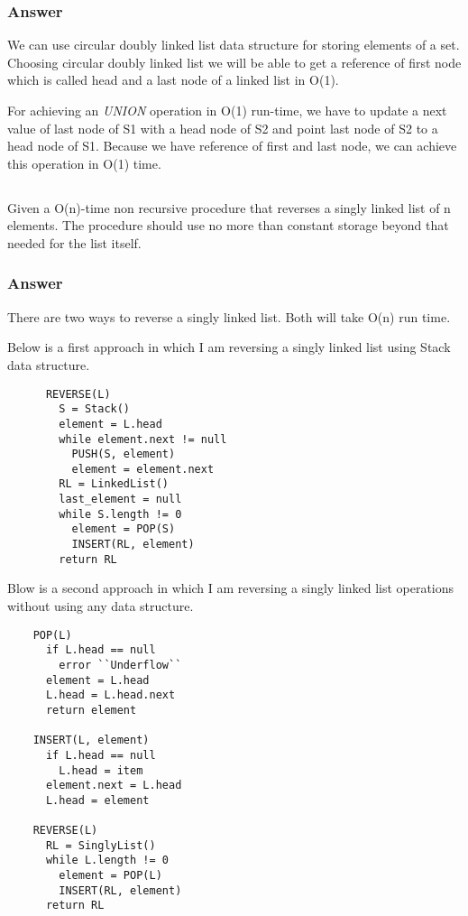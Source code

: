     \subsubsection{Answer}

    We can use circular doubly linked list data structure for storing elements
    of a set. Choosing circular doubly linked list we will be able to get a
    reference of first node which is called head and a last node of a linked
    list in O(1).

    For achieving an \textit{UNION} operation in O(1) run-time, we have to
    update a next value of last node of S1 with a head node of S2 and point
    last node of S2 to a head node of S1. Because we have reference of first
    and last node, we can achieve this operation in O(1) time.

    \subsection{}

    Given a O(n)-time non recursive procedure that reverses a singly linked list
    of n elements. The procedure should use no more than constant storage
    beyond that needed for the list itself.

    \subsubsection{Answer}

    There are two ways to reverse a singly linked list. Both will take O(n) run
    time.

    Below is a first approach in which I am reversing a singly linked list
    using Stack data structure.

    \begin{verbatim}
      REVERSE(L)
        S = Stack()
        element = L.head
        while element.next != null
          PUSH(S, element)
          element = element.next
        RL = LinkedList()
        last_element = null
        while S.length != 0
          element = POP(S)
          INSERT(RL, element)
        return RL
    \end{verbatim}

    Blow is a second approach in which I am reversing a singly linked list
    operations without using any data structure.

    \begin{verbatim}
    POP(L)
      if L.head == null
        error ``Underflow``
      element = L.head
      L.head = L.head.next
      return element

    INSERT(L, element)
      if L.head == null
        L.head = item
      element.next = L.head
      L.head = element

    REVERSE(L)
      RL = SinglyList()
      while L.length != 0
        element = POP(L)
        INSERT(RL, element)
      return RL
    \end{verbatim}

